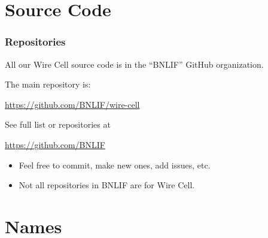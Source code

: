 \documentclass[xcolor=dvipsnames]{beamer}
\begin{document}





\section{Source Code}

\begin{frame}
  \frametitle{Repositories}

  All our Wire Cell source code is in the ``BNLIF'' GitHub organization.

  \vspace{3mm}

  The main repository is:
  \begin{center}
    \url{https://github.com/BNLIF/wire-cell}
  \end{center}
  
  See full list or repositories at

  \begin{center}
    \url{https://github.com/BNLIF}    
  \end{center}

  \begin{itemize}
  \item Feel free to commit, make new ones, add issues, etc.
  \item Not all repositories in BNLIF are for Wire Cell.
  \end{itemize}
\end{frame}

\section{Names}

\begin{frame}[fragile]
\end{frame}
\end{document}
